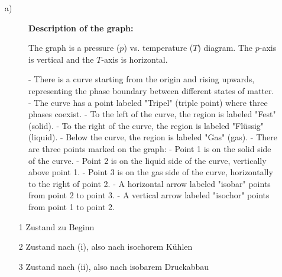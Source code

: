 a)

\begin{figure}[h!]
\centering
\begin{minipage}{0.8\textwidth}
\textbf{Description of the graph:}

The graph is a pressure ($p$) vs. temperature ($T$) diagram. The $p$-axis is vertical and the $T$-axis is horizontal. 

- There is a curve starting from the origin and rising upwards, representing the phase boundary between different states of matter.
- The curve has a point labeled "Tripel" (triple point) where three phases coexist.
- To the left of the curve, the region is labeled "Fest" (solid).
- To the right of the curve, the region is labeled "Flüssig" (liquid).
- Below the curve, the region is labeled "Gas" (gas).
- There are three points marked on the graph:
  - Point 1 is on the solid side of the curve.
  - Point 2 is on the liquid side of the curve, vertically above point 1.
  - Point 3 is on the gas side of the curve, horizontally to the right of point 2.
- A horizontal arrow labeled "isobar" points from point 2 to point 3.
- A vertical arrow labeled "isochor" points from point 1 to point 2.

\end{minipage}
\end{figure}

\begin{itemize}
    \item[1] Zustand zu Beginn
    \item[2] Zustand nach (i), also nach isochorem Kühlen
    \item[3] Zustand nach (ii), also nach isobarem Druckabbau
\end{itemize}